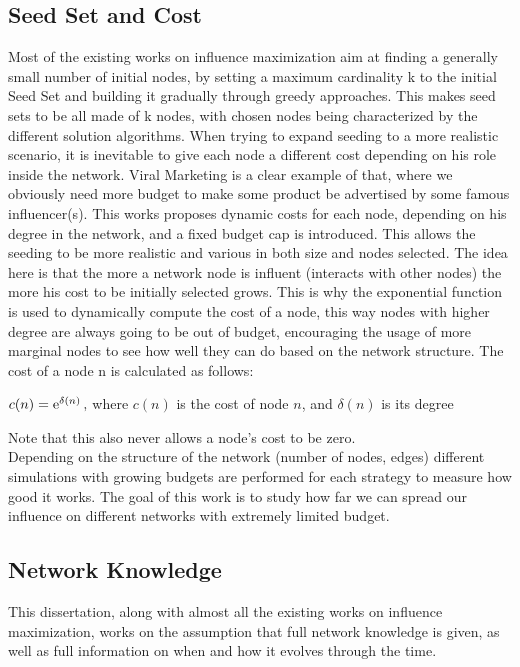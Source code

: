 \subsection{Seed Set and Cost}
\label{sec:dycost}
Most of the existing works on influence maximization aim at finding a generally small number of initial nodes, by setting a maximum cardinality k to the initial Seed Set and building it gradually through greedy approaches. This makes seed sets to be all made of k nodes, with chosen nodes being characterized by the different solution algorithms.  When trying to expand seeding to a more realistic scenario, it is inevitable to give each node a different cost depending on his role inside the network. Viral Marketing is a clear example of that, where we obviously need more budget to make some product be advertised by some famous influencer(s).
This works proposes dynamic costs for each node, depending on his degree in the network, and a fixed budget cap is introduced. This allows the seeding to be more realistic and various in both size and nodes selected. The idea here is that the more a network node is influent (interacts with other nodes) the more his cost to be initially selected grows. This is why the exponential function is used to dynamically compute the cost of a node, this way nodes with higher degree are always going to be out of budget, encouraging the usage of more marginal nodes to see how well they can do based on the network structure.
The cost of a node n is calculated as follows:
\begin{center}
    $c(n) = {\rm e}^{\delta(n)} \, ,$
where $c(n)$ is the cost of node $n$, and $\delta(n)$ is its degree
\end{center}
Note that this also never allows a node's cost to be zero.
\\
Depending on the structure of the network (number of nodes, edges) different simulations with growing budgets are performed for each strategy to measure how good it works. The goal of this work is to study how far we can spread our influence on different networks with extremely limited budget.

\subsection{Network Knowledge}
\label{sec:input}
This dissertation, along with almost all the existing works on influence maximization, works on the assumption that full network knowledge is given, as well as full information on when and how it evolves through the time. 


